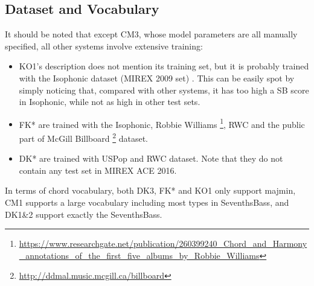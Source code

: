 \subsection{Dataset and Vocabulary}
It should be noted that except CM3, whose model parameters are all manually specified, all other systems involve extensive training:
\begin{itemize}
\item KO1's description does not mention its training set, but it is probably trained with the Isophonic dataset (MIREX 2009 set) \cite{burgoyne2014comparative}. This can be easily spot by simply noticing that, compared with other systems, it has too high a SB score in Isophonic, while not as high in other test sets.

\item FK* are trained with the Isophonic, Robbie Williams \footnote{\url{https://www.researchgate.net/publication/260399240\_Chord\_and\_Harmony\_annotations\_of\_the\_first\_five\_albums\_by\_Robbie\_Williams}}, RWC and the public part of McGill Billboard \footnote{\url{http://ddmal.music.mcgill.ca/billboard}} dataset.

\item DK* are trained with USPop and RWC dataset. Note that they do not contain any test set in MIREX ACE 2016.
\end{itemize}

In terms of chord vocabulary, both DK3, FK* and KO1 only support majmin, CM1 supports a large vocabulary including most types in SeventhsBass, and DK1\&2 support exactly the SeventhsBass.

